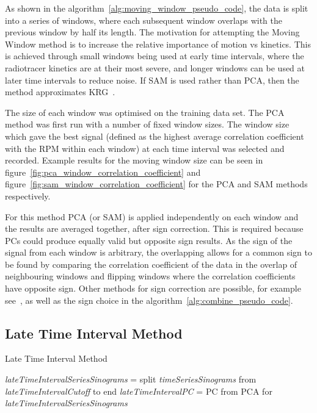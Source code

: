         As shown in the algorithm~\ref{alg:moving_window_pseudo_code}, the data is split into a series of windows, where each subsequent window overlaps with the previous window by half its length. The motivation for attempting the Moving Window method is to increase the relative importance of motion vs kinetics. This is achieved through small windows being used at early time intervals, where the radiotracer kinetics are at their most severe, and longer windows can be used at later time intervals to reduce noise.  If \gls{SAM} is used rather than \gls{PCA}, then the method approximates \gls{KRG}~\parencite{Schleyer2014}.
            
        The size of each window was optimised on the training data set. The PCA method was first run with a number of fixed window sizes. The window size which gave the best signal (defined as the highest average correlation coefficient with the \gls{RPM} within each window) at each time interval was selected and recorded. Example results for the moving window size can be seen in figure~\ref{fig:pca_window_correlation_coefficient} and figure~\ref{fig:sam_window_correlation_coefficient} for the \gls{PCA} and \gls{SAM} methods respectively.
            
        For this method \gls{PCA} (or \gls{SAM}) is applied independently on each window and the results are averaged together, after sign correction. This is required because \glspl{PC} could produce equally valid but opposite sign results. As the sign of the signal from each window is arbitrary, the overlapping allows for a common sign to be found by comparing the correlation coefficient of the data in the overlap of neighbouring windows and flipping windows where the correlation coefficients have opposite sign. Other methods for sign correction are possible, for example see~\parencite{Bertolli2017, Feng2018Self-gating:PET}, as well as the sign choice in the algorithm~\ref{alg:combine_pseudo_code}.
            
    \subsection{Late Time Interval Method} \label{sec:late_time_interval_method}
        \begin{algorithm} \label{alg:late_time_interval_method_pseudo_code}
            \caption{Late Time Interval Method}
            \textit{lateTimeIntervalSeriesSinograms} = split \textit{timeSeriesSinograms} from \textit{lateTimeIntervalCutoff} to end\;
            \textit{lateTimeIntervalPC} = \gls{PC} from \gls{PCA} for \textit{lateTimeIntervalSeriesSinograms}\;
            \;
        \end{algorithm}
            
